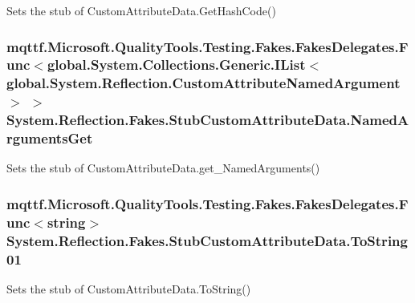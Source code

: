 Sets the stub of Custom\-Attribute\-Data.\-Get\-Hash\-Code()

\hypertarget{class_system_1_1_reflection_1_1_fakes_1_1_stub_custom_attribute_data_aae8cc17ce6723853d5fbe80a760244e3}{
\subsubsection[{Named\-Arguments\-Get}]{\setlength{\rightskip}{0pt plus 5cm}mqttf.\-Microsoft.\-Quality\-Tools.\-Testing.\-Fakes.\-Fakes\-Delegates.\-Func$<$global.\-System.\-Collections.\-Generic.\-I\-List$<$global.\-System.\-Reflection.\-Custom\-Attribute\-Named\-Argument$>$ $>$ System.\-Reflection.\-Fakes.\-Stub\-Custom\-Attribute\-Data.\-Named\-Arguments\-Get}}\label{class_system_1_1_reflection_1_1_fakes_1_1_stub_custom_attribute_data_aae8cc17ce6723853d5fbe80a760244e3}


Sets the stub of Custom\-Attribute\-Data.\-get\-\_\-\-Named\-Arguments()

\hypertarget{class_system_1_1_reflection_1_1_fakes_1_1_stub_custom_attribute_data_aca3e76e2362e150da74bda53adecb43b}{
\subsubsection[{To\-String01}]{\setlength{\rightskip}{0pt plus 5cm}mqttf.\-Microsoft.\-Quality\-Tools.\-Testing.\-Fakes.\-Fakes\-Delegates.\-Func$<$string$>$ System.\-Reflection.\-Fakes.\-Stub\-Custom\-Attribute\-Data.\-To\-String01}}\label{class_system_1_1_reflection_1_1_fakes_1_1_stub_custom_attribute_data_aca3e76e2362e150da74bda53adecb43b}


Sets the stub of Custom\-Attribute\-Data.\-To\-String()



